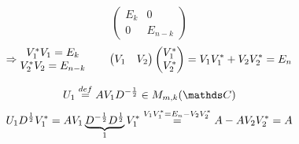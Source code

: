 \documentclass[main]{subfiles}
\begin{document}
\begin{Proof}
\[\begin{pmatrix}
        E_k & 0\\
        0 & E_{n - k}
        \end{pmatrix}\]
        \[\Ra \begin{matrix}
            V_1^*V_1 = E_k\\
            V_2^*V_2 = E_{n - k}
        \end{matrix} \qq \begin{pmatrix}
        V_1 & V_2
        \end{pmatrix} \begin{pmatrix}
            V_1^*\\
            V_2^*
        \end{pmatrix} = V_1V_1^* + V_2V_2^* = E_n\]

        \[U_1 \os{def}{=} AV_1D^{-\frac{1}{2}} \in M_{m, k}(\CC)  \]
        \[U_1 D^{\frac{1}{2}}V_{1}^* = AV_1 \ub{1}{D^{-\frac{1}{2}}D^{\frac{1}{2}}} V_1^* \os{V_1 V_1^* = E_n - V_2 V_2^*}{=} A - AV_2V_2^*  = A \]
    \end{Proof}
\end{document}
